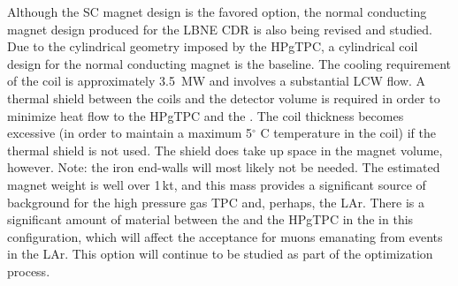 Although the SC magnet design is the favored option, the normal conducting magnet design produced for the LBNE CDR is also being revised and studied.  Due to the cylindrical geometry imposed by the HPgTPC, a cylindrical coil design for the normal conducting magnet is the baseline. The cooling requirement of the coil is approximately \SI{3.5}{MW} and involves a substantial LCW flow. A thermal shield between the coils and the detector volume is required in order to minimize heat flow to the HPgTPC and the . The coil thickness becomes excessive (in order to maintain a maximum 5$^\circ$ C temperature in the coil) if the thermal shield is not used.  The shield does take up space in the magnet volume, however.  %
Note: the iron end-walls will most likely not be needed. The estimated magnet weight is well over 1\,kt, and this mass provides a significant source of background for the high pressure gas TPC and, perhaps, the LAr.  There is a significant amount of material between the  and the HPgTPC in the  in this configuration, which will affect the acceptance for muons emanating from events in the LAr. This option will continue to be studied as part of the optimization process.
%
%

    
